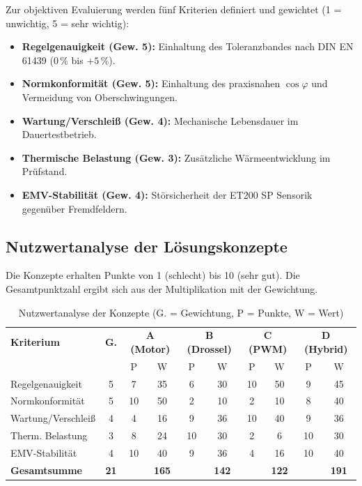 Zur objektiven Evaluierung werden fünf Kriterien definiert und gewichtet (1 = unwichtig, 5 = sehr wichtig):
\begin{itemize}
    \item \textbf{Regelgenauigkeit (Gew. 5):} Einhaltung des Toleranzbandes nach DIN EN 61439 ($0\,\%$ bis $+5\,\%$).
    \item \textbf{Normkonformität (Gew. 5):} Einhaltung des praxisnahen $\cos\varphi$ und Vermeidung von Oberschwingungen.
    \item \textbf{Wartung/Verschleiß (Gew. 4):} Mechanische Lebensdauer im Dauertestbetrieb.
    \item \textbf{Thermische Belastung (Gew. 3):} Zusätzliche Wärmeentwicklung im Prüfstand.
    \item \textbf{EMV-Stabilität (Gew. 4):} Störsicherheit der ET200 SP Sensorik gegenüber Fremdfeldern.
\end{itemize}

\subsection{Nutzwertanalyse der Lösungskonzepte}
\label{sec:nutzwertanalyse}

Die Konzepte erhalten Punkte von 1 (schlecht) bis 10 (sehr gut). Die Gesamtpunktzahl ergibt sich aus der Multiplikation mit der Gewichtung.

\begin{table}[htbp]
    \centering
    \caption{Nutzwertanalyse der Konzepte (G. = Gewichtung, P = Punkte, W = Wert)}
    \label{tab:nutzwertanalyse_kompakt}
    \begin{tabular}{l|c|cc|cc|cc|cc}
        \hline
        \textbf{Kriterium} & \textbf{G.} & \multicolumn{2}{c|}{\textbf{A (Motor)}} & \multicolumn{2}{c|}{\textbf{B (Drossel)}} & \multicolumn{2}{c|}{\textbf{C (PWM)}} & \multicolumn{2}{c}{\textbf{D (Hybrid)}} \\
        & & P & W & P & W & P & W & P & W \\
        \hline
        Regelgenauigkeit   & 5 & 7  & 35 & 6  & 30 & 10 & 50 & 9  & 45 \\
        Normkonformität    & 5 & 10 & 50 & 2  & 10 & 2  & 10 & 8  & 40 \\
        Wartung/Verschleiß & 4 & 4  & 16 & 9  & 36 & 10 & 40 & 9  & 36 \\
        Therm. Belastung   & 3 & 8  & 24 & 10 & 30 & 2  & 6  & 10 & 30 \\
        EMV-Stabilität     & 4 & 10 & 40 & 9  & 36 & 4  & 16 & 10 & 40 \\
        \hline
        \textbf{Gesamtsumme}& \textbf{21}& & \textbf{165} & & \textbf{142} & & \textbf{122} & & \textbf{191} \\
        \hline
    \end{tabular}
\end{table}

